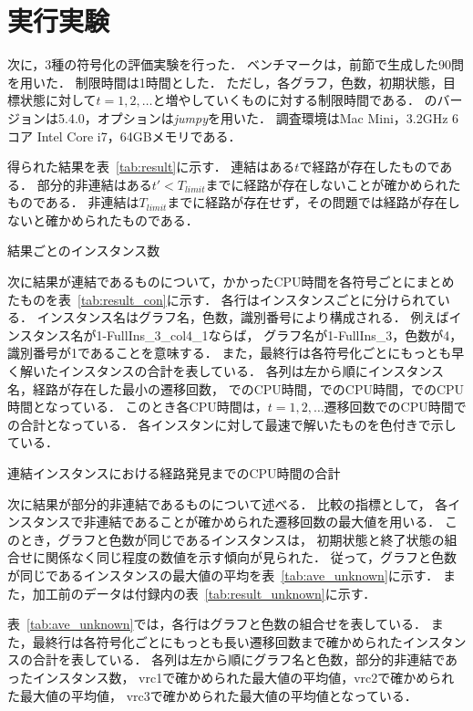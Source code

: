 \section{実行実験}
次に，3種の符号化の評価実験を行った．
ベンチマークは，前節で生成した90問を用いた．
制限時間は1時間とした．
ただし，各グラフ，色数，初期状態，目標状態に対して$t=1, 2, \dots$と増やしていくものに対する制限時間である．
{\clingo}のバージョンは5.4.0，オプションは\textsl{jumpy}を用いた．
調査環境はMac Mini，3.2GHz 6コア Intel Core i7，64GBメモリである．

得られた結果を表~\ref{tab:result}に示す．
連結はある$t$で経路が存在したものである．
部分的非連結はある$t' < T_{limit}$までに経路が存在しないことが確かめられたものである．
非連結は$T_{limit}$までに経路が存在せず，その問題では経路が存在しないと確かめられたものである．

\begin{table}
  \centering
  \caption{結果ごとのインスタンス数}
  
  \label{tab:result}
\end{table}

次に結果が連結であるものについて，かかったCPU時間を各符号ごとにまとめたものを表~\ref{tab:result_con}に示す．
各行はインスタンスごとに分けられている．
インスタンス名はグラフ名，色数，識別番号により構成される．
例えばインスタンス名が1-FullIns\_3\_col4\_1ならば，
グラフ名が1-FullIns\_3，色数が4，識別番号が1であることを意味する．
また，最終行は各符号化ごとにもっとも早く解いたインスタンスの合計を表している．
各列は左から順にインスタンス名，経路が存在した最小の遷移回数，
でのCPU時間，でのCPU時間，でのCPU時間となっている．
このとき各CPU時間は，$t=1, 2, \dots $遷移回数でのCPU時間での合計となっている．
各インスタンに対して最速で解いたものを色付きで示している．

\begin{table}
  \centering
  \caption{連結インスタンスにおける経路発見までのCPU時間の合計}
  
  \label{tab:result_con}
\end{table}

次に結果が部分的非連結であるものについて述べる．
比較の指標として，
各インスタンスで非連結であることが確かめられた遷移回数の最大値を用いる．
このとき，グラフと色数が同じであるインスタンスは，
初期状態と終了状態の組合せに関係なく同じ程度の数値を示す傾向が見られた．
従って，グラフと色数が同じであるインスタンスの最大値の平均を表~\ref{tab:ave_unknown}に示す．
また，加工前のデータは付録内の表~\ref{tab:result_unknown}に示す．

表~\ref{tab:ave_unknown}では，各行はグラフと色数の組合せを表している．
また，最終行は各符号化ごとにもっとも長い遷移回数まで確かめられたインスタンスの合計を表している．
各列は左から順にグラフ名と色数，部分的非連結であったインスタンス数，
vrc1で確かめられた最大値の平均値，vrc2で確かめられた最大値の平均値，
vrc3で確かめられた最大値の平均値となっている．

